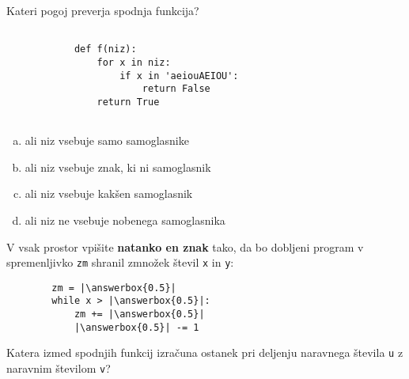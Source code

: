 \documentclass[arhiv, 10pt]{../izpit}
\newcommand{\inlinepy}[1]{\texttt{#1}}
\newcommand{\answerbox}[1]{\framebox{\vphantom{\large M}\hspace{#1cm}}}
\begin{document}
        \naloga*

        \begin{multicols}{2}
        \noindent
        Kateri pogoj preverja spodnja funkcija?
        \begin{verbatim}
        
            def f(niz):
                for x in niz:
                    if x in 'aeiouAEIOU':
                        return False
                return True
            
        \end{verbatim}

        \begin{enumerate}[(a)]
\item ali niz vsebuje samo samoglasnike
\item ali niz vsebuje znak, ki ni samoglasnik
\item ali niz vsebuje kakšen samoglasnik
\item ali niz ne vsebuje nobenega samoglasnika
\end{enumerate}

        \end{multicols}
    
        \naloga*
        \begin{multicols}{2}
        \noindent
        V vsak prostor vpišite \textbf{natanko en znak} tako, da bo dobljeni program v spremenljivko \inlinepy{zm} shranil zmnožek števil \inlinepy{x} in \inlinepy{y}:
        
        \columnbreak
        \begin{verbatim}
        zm = |\answerbox{0.5}|
        while x > |\answerbox{0.5}|:
            zm += |\answerbox{0.5}|
            |\answerbox{0.5}| -= 1
        \end{verbatim}
        \end{multicols}
    
        \clearpage
        \naloga
        
        Katera izmed spodnjih funkcij izračuna ostanek pri deljenju naravnega števila \inlinepy{u} z naravnim številom \inlinepy{v}?
    
\end{document}

